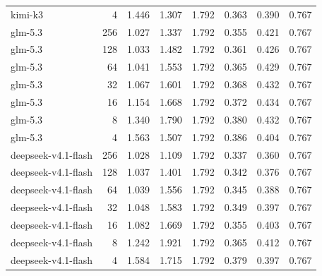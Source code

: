 \begin{longtable}{lrrrrrrr}
kimi-k3 & 4 & 1.446 & 1.307 & 1.792 & 0.363 & 0.390 & 0.767 \\
glm-5.3 & 256 & 1.027 & 1.337 & 1.792 & 0.355 & 0.421 & 0.767 \\
glm-5.3 & 128 & 1.033 & 1.482 & 1.792 & 0.361 & 0.426 & 0.767 \\
glm-5.3 & 64 & 1.041 & 1.553 & 1.792 & 0.365 & 0.429 & 0.767 \\
glm-5.3 & 32 & 1.067 & 1.601 & 1.792 & 0.368 & 0.432 & 0.767 \\
glm-5.3 & 16 & 1.154 & 1.668 & 1.792 & 0.372 & 0.434 & 0.767 \\
glm-5.3 & 8 & 1.340 & 1.790 & 1.792 & 0.380 & 0.432 & 0.767 \\
glm-5.3 & 4 & 1.563 & 1.507 & 1.792 & 0.386 & 0.404 & 0.767 \\
deepseek-v4.1-flash & 256 & 1.028 & 1.109 & 1.792 & 0.337 & 0.360 & 0.767 \\
deepseek-v4.1-flash & 128 & 1.037 & 1.401 & 1.792 & 0.342 & 0.376 & 0.767 \\
deepseek-v4.1-flash & 64 & 1.039 & 1.556 & 1.792 & 0.345 & 0.388 & 0.767 \\
deepseek-v4.1-flash & 32 & 1.048 & 1.583 & 1.792 & 0.349 & 0.397 & 0.767 \\
deepseek-v4.1-flash & 16 & 1.082 & 1.669 & 1.792 & 0.355 & 0.403 & 0.767 \\
deepseek-v4.1-flash & 8 & 1.242 & 1.921 & 1.792 & 0.365 & 0.412 & 0.767 \\
deepseek-v4.1-flash & 4 & 1.584 & 1.715 & 1.792 & 0.379 & 0.397 & 0.767 \\
\bottomrule
\end{longtable}
